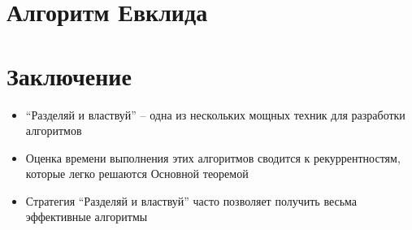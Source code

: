 \documentclass[a4paper,11pt]{article}
\begin{document}
\section{Алгоритм Евклида}


\section*{Заключение}
\begin{itemize}
\item ``Разделяй и властвуй'' -- одна из нескольких мощных техник для разработки
  алгоритмов
\item Оценка времени выполнения этих алгоритмов сводится к рекуррентностям,
  которые легко решаются Основной теоремой
\item Стратегия ``Разделяй и властвуй'' часто позволяет получить весьма
  эффективные алгоритмы
\end{itemize}
\end{document}
